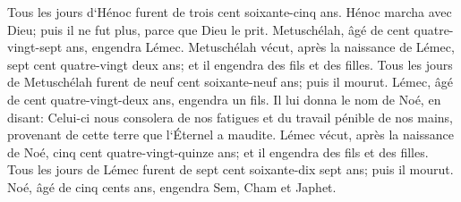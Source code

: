\verse Tous les jours d`Hénoc furent de trois cent soixante-cinq ans. 
\verse Hénoc marcha avec Dieu; puis il ne fut plus, parce que Dieu le prit. 
\verse Metuschélah, âgé de cent quatre-vingt-sept ans, engendra Lémec. 
\verse Metuschélah vécut, après la naissance de Lémec, sept cent quatre-vingt deux ans; et il engendra des fils et des filles. 
\verse Tous les jours de Metuschélah furent de neuf cent soixante-neuf ans; puis il mourut. 
\verse Lémec, âgé de cent quatre-vingt-deux ans, engendra un fils. 
\verse Il lui donna le nom de Noé, en disant: Celui-ci nous consolera de nos fatigues et du travail pénible de nos mains, provenant de cette terre que l`Éternel a maudite. 
\verse Lémec vécut, après la naissance de Noé, cinq cent quatre-vingt-quinze ans; et il engendra des fils et des filles. 
\verse Tous les jours de Lémec furent de sept cent soixante-dix sept ans; puis il mourut. 
\verse Noé, âgé de cinq cents ans, engendra Sem, Cham et Japhet. 

